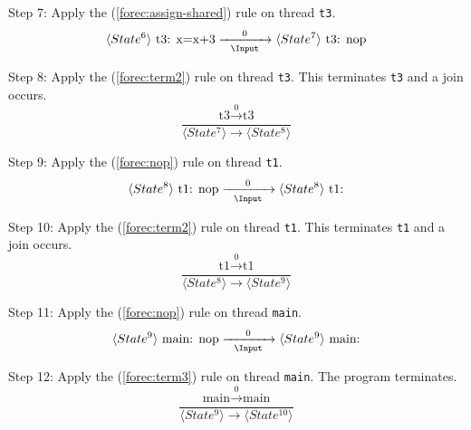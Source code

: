 \noindent
Step 7: Apply the (\ref{forec:assign-shared}) rule on thread \verb$t3$.
\begin{equation*}
	\langle State^6 \rangle ~ \text{t3: x=x+3}
		\xrightarrow[~~\Input~~]{0} 
	\langle State^7 \rangle ~ \text{t3: nop}
\end{equation*}

\noindent
Step 8: Apply the (\ref{forec:term2}) rule on thread \verb$t3$.
This terminates \verb$t3$ and a join occurs.
\begin{equation*}
	\frac{
			\text{t3} \xrightarrow{~~0~~} \text{t3}
		}{
			\langle State^7 \rangle \xrightarrow{~~~~~} \langle State^8 \rangle
		}
\end{equation*}

\noindent
Step 9: Apply the (\ref{forec:nop}) rule on thread \verb$t1$.
\begin{equation*}
	\langle State^8 \rangle ~ \text{t1: nop}
		\xrightarrow[~~\Input~~]{0} 
	\langle State^8 \rangle ~ \text{t1:}
\end{equation*}

\noindent
Step 10: Apply the (\ref{forec:term2}) rule on thread \verb$t1$.
This terminates \verb$t1$ and a join occurs.
\begin{equation*}
	\frac{
			\text{t1} \xrightarrow{~~0~~} \text{t1}
		}{
			\langle State^8 \rangle \xrightarrow{~~~~~} \langle State^9 \rangle
		}
\end{equation*}

\noindent
Step 11: Apply the (\ref{forec:nop}) rule on thread \verb$main$.
\begin{equation*}
	\langle State^9 \rangle ~ \text{main: nop}
		\xrightarrow[~~\Input~~]{0} 
	\langle State^9 \rangle ~ \text{main:}
\end{equation*}

\noindent
Step 12: Apply the (\ref{forec:term3}) rule on thread \verb$main$.
The program terminates.
\begin{equation*}
	\frac{
			\text{main} \xrightarrow{~~0~~} \text{main}
		}{
			\langle State^9 \rangle \xrightarrow{~~~~~} \langle State^{10} \rangle
		}
\end{equation*}



